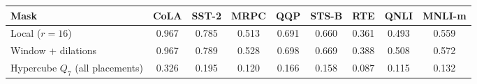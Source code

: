 \begin{tabular}{lcccccccc}
\toprule
Mask & CoLA & SST-2 & MRPC & QQP & STS-B & RTE & QNLI & MNLI-m \\
\midrule
Local ($r{=}16$) & 0.967 & 0.785 & 0.513 & 0.691 & 0.660 & 0.361 & 0.493 & 0.559 \\
Window + dilations & 0.967 & 0.789 & 0.528 & 0.698 & 0.669 & 0.388 & 0.508 & 0.572 \\
Hypercube $Q_7$ (all placements) & 0.326 & 0.195 & 0.120 & 0.166 & 0.158 & 0.087 & 0.115 & 0.132 \\
\bottomrule
\end{tabular}
